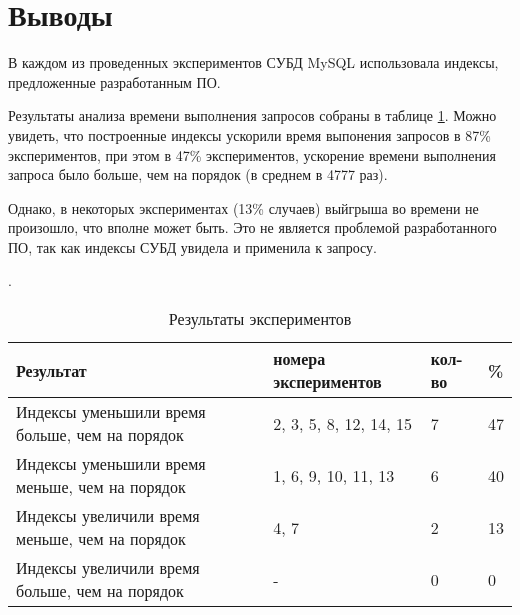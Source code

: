\section{Выводы}

В каждом из проведенных экспериментов СУБД MySQL использовала индексы, предложенные разработанным ПО. 

Результаты анализа времени выполнения запросов собраны в таблице \ref{table:list_experiments_result}. Можно увидеть, что построенные индексы ускорили время выпонения запросов в 87\% экспериментов, при этом в 47\% экспериментов, ускорение времени выполнения запроса было больше, чем на порядок (в среднем в 4777 раз).

Однако, в некоторых экспериментах (13\% случаев) выйгрыша во времени не произошло, что вполне может быть. Это не является проблемой разработанного ПО, так как индексы СУБД увидела и применила к запросу.

\begin{table}[h]
\caption{Результаты экспериментов}\label{table:list_experiments_result}.
\medskip
\begin{tabular}{|p{6cm}|l|l|l|}
\hline
Результат & номера экспериментов & кол-во & \%\\
\hline
Индексы уменьшили время больше, чем на порядок & 2, 3, 5, 8, 12, 14, 15 & 7 & 47\\\hline
Индексы уменьшили время меньше, чем на порядок & 1, 6, 9, 10, 11, 13 & 6& 40 \\\hline
Индексы увеличили время меньше, чем на порядок & 4, 7 & 2& 13\\\hline
Индексы увеличили время больше, чем на порядок & - & 0& 0\\\hline

\end{tabular}
\end{table}
